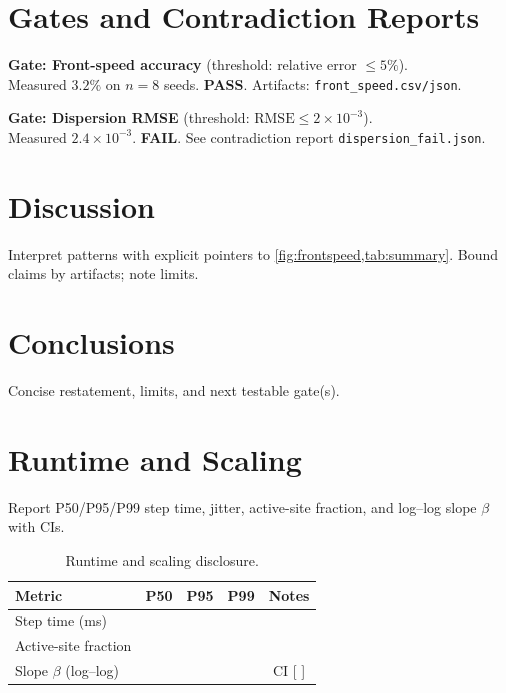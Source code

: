 \documentclass[%
 reprint,                %
 superscriptaddress,     %
 aps,                    %
 prx,                    %
]{revtex4-2}
\begin{document}
\section{Gates and Contradiction Reports}
\label{sec:gates}
\noindent\textbf{Gate: Front-speed accuracy} (threshold: relative error $\le 5\%$).\\
Measured $3.2\%$ on $n=8$ seeds. \textbf{PASS}. Artifacts: \texttt{front\_speed.csv/json}.

\medskip
\noindent\textbf{Gate: Dispersion RMSE} (threshold: $\mathrm{RMSE}\le 2\times10^{-3}$).\\
Measured $2.4\times10^{-3}$. \textbf{FAIL}. See contradiction report \texttt{dispersion\_fail.json}.

\section{Discussion}
Interpret patterns with explicit pointers to \cref{fig:frontspeed,tab:summary}.
Bound claims by artifacts; note limits.

\section{Conclusions}
Concise restatement, limits, and next testable gate(s).

\section{Runtime and Scaling}
Report P50/P95/P99 step time, jitter, active-site fraction, and log–log slope $\beta$ with CIs.

\begin{table}[t]
  \caption{Runtime and scaling disclosure.}
  \label{tab:runtime}
  \begin{ruledtabular}
  \begin{tabular}{lcccc}
    Metric & P50 & P95 & P99 & Notes \\
    \hline
    Step time (ms) &  &  &  & \\
    Active-site fraction &  &  &  & \\
    Slope $\beta$ (log–log) &  &  &  & CI [\,\,] \\
  \end{tabular}
  \end{ruledtabular}
\end{table}

\nocite{*}


\end{document}
